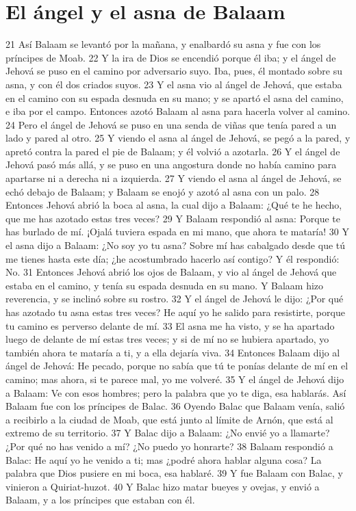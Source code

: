 \section*{El ángel y el asna de Balaam}

21 Así Balaam se levantó por la mañana, y enalbardó su asna y fue con los príncipes de Moab.
22 Y la ira de Dios se encendió porque él iba; y el ángel de Jehová se puso en el camino por adversario suyo. Iba, pues, él montado sobre su asna, y con él dos criados suyos.
23 Y el asna vio al ángel de Jehová, que estaba en el camino con su espada desnuda en su mano; y se apartó el asna del camino, e iba por el campo. Entonces azotó Balaam al asna para hacerla volver al camino.
24 Pero el ángel de Jehová se puso en una senda de viñas que tenía pared a un lado y pared al otro.
25 Y viendo el asna al ángel de Jehová, se pegó a la pared, y apretó contra la pared el pie de Balaam; y él volvió a azotarla.
26 Y el ángel de Jehová pasó más allá, y se puso en una angostura donde no había camino para apartarse ni a derecha ni a izquierda.
27 Y viendo el asna al ángel de Jehová, se echó debajo de Balaam; y Balaam se enojó y azotó al asna con un palo.
28 Entonces Jehová abrió la boca al asna, la cual dijo a Balaam: ¿Qué te he hecho, que me has azotado estas tres veces?
29 Y Balaam respondió al asna: Porque te has burlado de mí. ¡Ojalá tuviera espada en mi mano, que ahora te mataría!
30 Y el asna dijo a Balaam: ¿No soy yo tu asna? Sobre mí has cabalgado desde que tú me tienes hasta este día; ¿he acostumbrado hacerlo así contigo? Y él respondió: No.
31 Entonces Jehová abrió los ojos de Balaam, y vio al ángel de Jehová que estaba en el camino, y tenía su espada desnuda en su mano. Y Balaam hizo reverencia, y se inclinó sobre su rostro.
32 Y el ángel de Jehová le dijo: ¿Por qué has azotado tu asna estas tres veces? He aquí yo he salido para resistirte, porque tu camino es perverso delante de mí.
33 El asna me ha visto, y se ha apartado luego de delante de mí estas tres veces; y si de mí no se hubiera apartado, yo también ahora te mataría a ti, y a ella dejaría viva.
34 Entonces Balaam dijo al ángel de Jehová: He pecado, porque no sabía que tú te ponías delante de mí en el camino; mas ahora, si te parece mal, yo me volveré.
35 Y el ángel de Jehová dijo a Balaam: Ve con esos hombres; pero la palabra que yo te diga, esa hablarás. Así Balaam fue con los príncipes de Balac.
36 Oyendo Balac que Balaam venía, salió a recibirlo a la ciudad de Moab, que está junto al límite de Arnón, que está al extremo de su territorio.
37 Y Balac dijo a Balaam: ¿No envié yo a llamarte? ¿Por qué no has venido a mí? ¿No puedo yo honrarte?
38 Balaam respondió a Balac: He aquí yo he venido a ti; mas ¿podré ahora hablar alguna cosa? La palabra que Dios pusiere en mi boca, esa hablaré.
39 Y fue Balaam con Balac, y vinieron a Quiriat-huzot.
40 Y Balac hizo matar bueyes y ovejas, y envió a Balaam, y a los príncipes que estaban con él.

